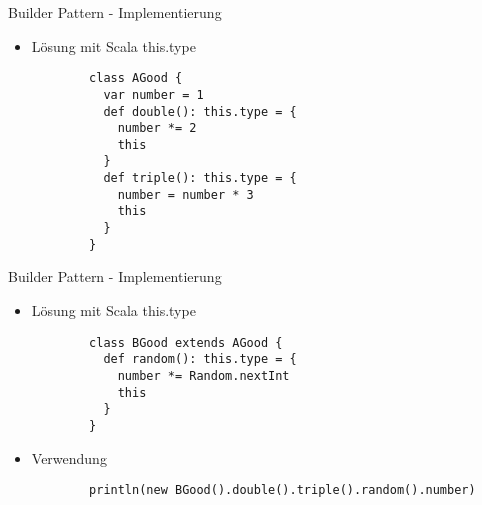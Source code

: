 
\begin{frame}[fragile]{Builder Pattern - Implementierung}
\begin{itemize}
	\item Lösung mit Scala this.type
		\begin{lstlisting}
		class AGood {
		  var number = 1
		  def double(): this.type = {
		    number *= 2
		    this
		  }
		  def triple(): this.type = {
		    number = number * 3
		    this
		  }
		}
		\end{lstlisting}
\end{itemize}
\end{frame}


\begin{frame}[fragile]{Builder Pattern - Implementierung}
\begin{itemize}
	\item Lösung mit Scala this.type
		\begin{lstlisting}
		class BGood extends AGood {
		  def random(): this.type = {
		    number *= Random.nextInt
		    this
		  }
		}
		\end{lstlisting}
	\item Verwendung
		\begin{lstlisting}
		println(new BGood().double().triple().random().number)
		\end{lstlisting}
\end{itemize}

\end{frame}


